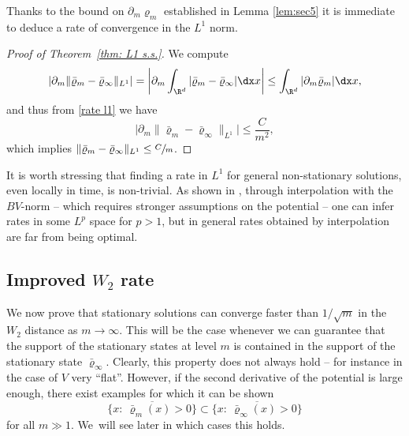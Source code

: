 Thanks to the bound on $\partial_m \varrho_{ m}$ established in Lemma \ref{lem:sec5} it is immediate to deduce a rate of convergence in the $L^1$ norm.
\begin{proof}[Proof of Theorem~\ref{thm: L1 s.s.}]
We compute
\begin{equation*}
|\partial_m \|\bar\varrho_m - \bar\varrho_\infty\|_{L^1}| = \left| \partial_m \int_{\R^d} |\bar\varrho_m -\bar\varrho_\infty| \dx x \right| \leq \int_{\R^d}|\partial_m \bar\varrho_m| \dx x,
\end{equation*}
and thus from \eqref{rate l1} we have
\begin{equation*}
\bigl|\partial_m\|\bar\varrho_m - \bar\varrho_\infty\|_{L^1}\bigr|\leq \frac{C}{m^2},
\end{equation*}
which implies
$
\|\bar\varrho_m - \bar\varrho_\infty\|_{L^1}\leq \sfrac{C}{m}$.
\end{proof}

It is worth stressing that finding a rate in $L^1$ for general non-stationary solutions, even locally in time, is non-trivial. As shown in \cite{DDP2021}, through interpolation with the $BV$-norm -- which requires stronger assumptions on the potential -- one can infer rates in some $L^p$ space for $p>1$, but in general rates obtained by interpolation are far from being optimal.

\subsection{Improved $W_2$ rate}

We now prove that stationary solutions can converge faster than $1/\sqrt{m}$ in the $W_2$ distance as $m\to\infty$. This will be the case whenever we can guarantee that the support of the stationary states at level $m$ is contained in the support of the stationary state $\bar\varrho_\infty$. Clearly, this property does not always hold -- for instance in the case of $V$ very ``flat''. However, if the second derivative of the potential is large enough, there exist examples for which it can be shown
\[
\overline{\{x: \ \bar\varrho_m (x)>0\}} \subset \overline{\{x: \ \bar\varrho_\infty(x)>0\}}
\]
for all $m\gg 1$. We~will see later in which cases this holds.

